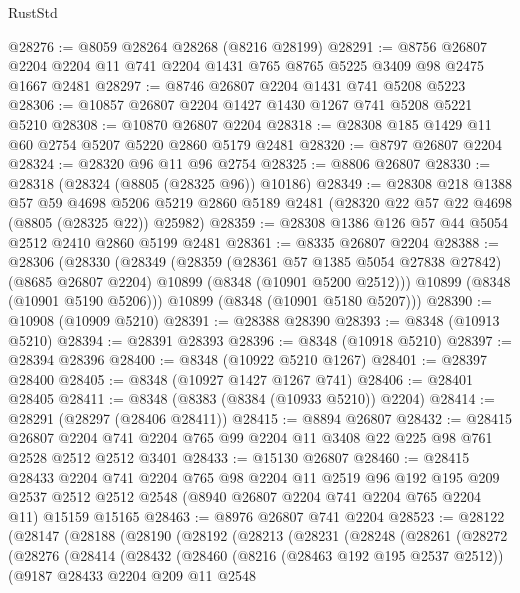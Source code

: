 \begin{lexlean}{RustStd}
\begin{coremodule}
@28276 := @8059 @28264 @28268 (@8216 @28199)
@28291 := @8756 @26807 @2204 @2204 @11 @741 @2204 @1431 @765 @8765 @5225 @3409 @98 @2475 @1667 @2481
@28297 := @8746 @26807 @2204 @1431 @741 @5208 @5223
@28306 := @10857 @26807 @2204 @1427 @1430 @1267 @741 @5208 @5221 @5210
@28308 := @10870 @26807 @2204
@28318 := @28308 @185 @1429 @11 @60 @2754 @5207 @5220 @2860 @5179 @2481
@28320 := @8797 @26807 @2204
@28324 := @28320 @96 @11 @96 @2754
@28325 := @8806 @26807
@28330 := @28318 (@28324 (@8805 (@28325 @96)) @10186)
@28349 := @28308
    @218
    @1388
    @57
    @59
    @4698
    @5206
    @5219
    @2860
    @5189
    @2481
    (@28320 @22 @57 @22 @4698 (@8805 (@28325 @22)) @25982)
@28359 := @28308 @1386 @126 @57 @44 @5054 @2512 @2410 @2860 @5199 @2481
@28361 := @8335 @26807 @2204
@28388 := @28306
    (@28330
      (@28349
        (@28359
          (@28361 @57 @1385 @5054 @27838 @27842)
          (@8685 @26807 @2204)
          @10899
          (@8348 (@10901 @5200 @2512)))
        @10899
        (@8348 (@10901 @5190 @5206)))
      @10899
      (@8348 (@10901 @5180 @5207)))
@28390 := @10908 (@10909 @5210)
@28391 := @28388 @28390
@28393 := @8348 (@10913 @5210)
@28394 := @28391 @28393
@28396 := @8348 (@10918 @5210)
@28397 := @28394 @28396
@28400 := @8348 (@10922 @5210 @1267)
@28401 := @28397 @28400
@28405 := @8348 (@10927 @1427 @1267 @741)
@28406 := @28401 @28405
@28411 := @8348 (@8383 (@8384 (@10933 @5210)) @2204)
@28414 := @28291 (@28297 (@28406 @28411))
@28415 := @8894 @26807
@28432 := @28415
    @26807
    @2204
    @741
    @2204
    @765
    @99
    @2204
    @11
    @3408
    @22
    @225
    @98
    @761
    @2528
    @2512
    @2512
    @3401
@28433 := @15130 @26807
@28460 := @28415
    @28433
    @2204
    @741
    @2204
    @765
    @98
    @2204
    @11
    @2519
    @96
    @192
    @195
    @209
    @2537
    @2512
    @2512
    @2548
    (@8940 @26807 @2204 @741 @2204 @765 @2204 @11)
    @15159
    @15165
@28463 := @8976 @26807 @741 @2204
@28523 := @28122
    (@28147
      (@28188
        (@28190
          (@28192
            (@28213
              (@28231
                (@28248
                  (@28261
                    (@28272
                      (@28276
                        (@28414
                          (@28432
                            (@28460
                              (@8216 (@28463 @192 @195 @2537 @2512))
                              (@9187
                                @28433
                                @2204
                                @209
                                @11
                                @2548

\end{coremodule}
\end{lexlean}

